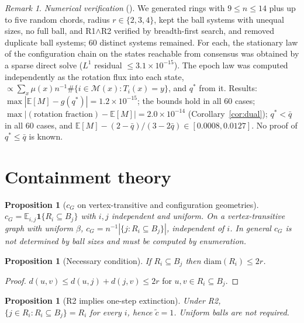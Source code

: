 \documentclass[aps,pre,onecolumn,superscriptaddress,amsmath,amssymb,longbibliography]{revtex4-2}
\newtheorem{proposition}[theorem]{Proposition}
\theoremstyle{definition}
\theoremstyle{remark}
\newtheorem{remark}[theorem]{Remark}
\newcommand{\ctil}{\tilde c}
\newcommand{\cG}{c_G}
\newcommand{\E}{\mathbb{E}}
\begin{document}
\begin{remark}
\label{rem:het-numerics}
\emph{Numerical verification} ().
We generated rings with $9\le n\le14$ plus up to five random chords,
radius $r\in\{2,3,4\}$, kept the ball systems with unequal sizes, no full
ball, and R1$\wedge$R2 verified by breadth-first search, and removed
duplicate ball systems; 60 distinct systems remained. For each, the
stationary law of the configuration chain on the states reachable from
consensus was obtained by a sparse direct solve ($L^1$ residual
$\le3.1\times10^{-15}$). The epoch law was computed independently as the
rotation flux into each state, $\propto\sum_x\mu(x)n^{-1}\#\{i\in\mathcal
M(x):T_i(x)=y\}$, and $q^\ast$ from it. Results: $\max|\E[M]-g(q^\ast)|=1.2\times10^{-15}$;
the bounds hold in all 60 cases; $\max|(\text{rotation fraction})-\E[M]|=2.0\times10^{-14}$
(Corollary~\ref{cor:dual}); $q^\ast<\bar q$ in all 60 cases, and
$\E[M]-(2-\bar q)/(3-2\bar q)\in[0.0008,0.0127]$. No proof of
$q^\ast\le\bar q$ is known.
\end{remark}

\section{Containment theory}
\label{sec:S5}

\begin{proposition}[$\cG$ on vertex-transitive and configuration geometries]
\label{prop:D1}
$\cG=\E_{i,j}\mathbf 1\{R_i\subseteq B_j\}$ with $i,j$ independent and
uniform. On a vertex-transitive graph with uniform $\beta$,
$\cG=n^{-1}|\{j:R_i\subseteq B_j\}|$, independent of $i$. In general
$\cG$ is not determined by ball sizes and must be computed by
enumeration.
\end{proposition}

\begin{proposition}[Necessary condition]
\label{prop:D2}
If $R_i\subseteq B_j$ then $\mathrm{diam}(R_i)\le2r$.
\end{proposition}
\begin{proof}
$d(u,v)\le d(u,j)+d(j,v)\le2r$ for $u,v\in R_i\subseteq B_j$.
\end{proof}

\begin{proposition}[R2 implies one-step extinction]
\label{prop:D3}
Under R2, $\{j\in R_i:R_i\subseteq B_j\}=R_i$ for every $i$, hence
$\ctil=1$. Uniform balls are not required.
\end{proposition}
\end{document}
